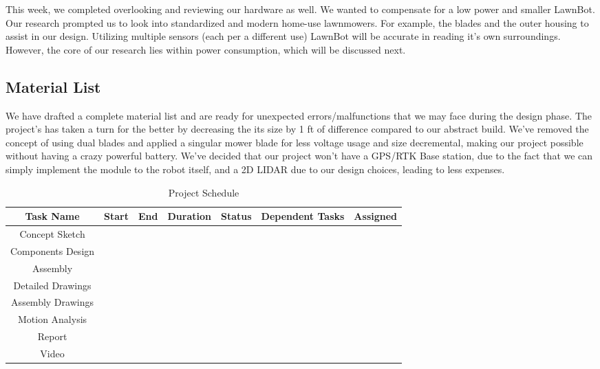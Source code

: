 This week, we completed overlooking and reviewing our hardware as well. We wanted to compensate for a low power and smaller LawnBot. Our research prompted us to look into standardized and modern home-use lawnmowers. For example, the blades and the outer housing to assist in our design. Utilizing multiple sensors (each per a different use) LawnBot will be accurate in reading it's own surroundings. However, the core of our research lies within power consumption, which will be discussed next. \par

\subsection{Material List}
We have drafted a complete material list and are ready for unexpected errors/malfunctions that we may face during the design phase. The project's has taken a turn for the better by decreasing the its size by 1 ft of difference compared to our abstract build. We've removed the concept of using dual blades and applied a singular mower blade for less voltage usage and size decremental, making our project possible without having a crazy powerful battery. We've decided that our project won't have a GPS/RTK Base station, due to the fact that we can simply implement the module to the robot itself, and a 2D LIDAR due to our design choices, leading to less expenses.\par

\begin{table}[H]
    \begin{center}
    \begin{tabular}{|c|c|l|l|l|l|l|} \hline 
    \textbf{Task Name}& \textbf{Start}& \textbf{End}& \textbf{Duration}& \textbf{Status}& \textbf{Dependent Tasks}& \textbf{Assigned} \\ \hline
        Concept Sketch& & & & & &  \\ \hline   
        Components Design& & & & & &  \\ \hline
        Assembly& & & & & &  \\ \hline 
        Detailed Drawings&& & & & &  \\ \hline 
        Assembly Drawings&& & & & &  \\ \hline 
        Motion Analysis&& & & & &  \\ \hline 
        Report&& & & & &  \\ \hline 
        Video&& & & & &  \\\hline
    \end{tabular}
    \end{center}
    \caption{Project Schedule} 
\label{tab:table1}
    
\end{table}

